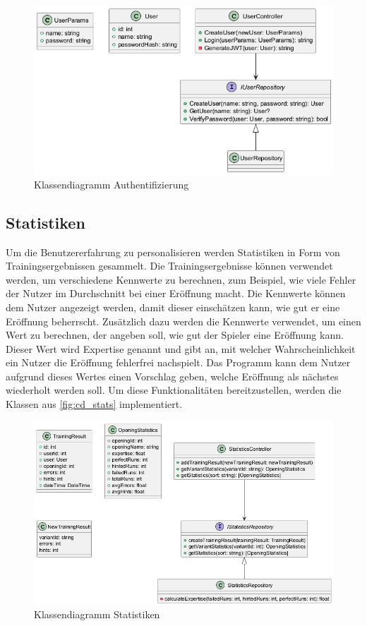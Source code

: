 \begin{figure}[h]
    \includegraphics[width=\linewidth]{images/diagrams/auth.png}
    \caption{Klassendiagramm Authentifizierung}
    \label{fig:cd_auth}
\end{figure}

\subsection{Statistiken}
Um die Benutzererfahrung zu personalisieren werden Statistiken in Form von Trainingsergebnissen gesammelt. Die Trainingsergebnisse können verwendet werden, um verschiedene Kennwerte zu berechnen, zum Beispiel, wie viele Fehler der Nutzer im Durchschnitt bei einer Eröffnung macht. Die Kennwerte können dem Nutzer angezeigt werden, damit dieser einschätzen kann, wie gut er eine Eröffnung beherrscht. Zusätzlich dazu werden die Kennwerte verwendet, um einen Wert zu berechnen, der angeben soll, wie gut der Spieler eine Eröffnung kann. Dieser Wert wird Expertise genannt und gibt an, mit welcher Wahrscheinlichkeit ein Nutzer die Eröffnung fehlerfrei nachspielt. Das Programm kann dem Nutzer aufgrund dieses Wertes einen Vorschlag geben, welche Eröffnung als nächstes wiederholt werden soll. Um diese Funktionalitäten bereitzustellen, werden die Klassen aus \autoref{fig:cd_stats} implementiert.

\begin{figure}[h]
    \includegraphics[width=\linewidth]{images/diagrams/stats.png}
    \caption{Klassendiagramm Statistiken}
    \label{fig:cd_stats}
\end{figure}


